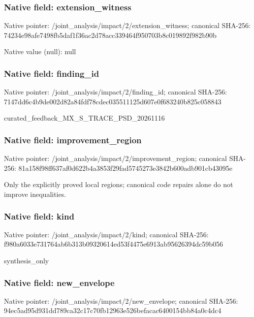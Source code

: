 \documentclass[10pt,a4paper]{article}
\begin{document}
\subsubsection{Native field: extension\_\allowbreak{}witness}
Native pointer: /joint\_\allowbreak{}analysis/impact/2/extension\_\allowbreak{}witness; canonical SHA-256: 74234e98afe7498fb5daf1f36ac2d78acc339464f950703b8c019892f982b90b

Native value (null): null

\subsubsection{Native field: finding\_\allowbreak{}id}
Native pointer: /joint\_\allowbreak{}analysis/impact/2/finding\_\allowbreak{}id; canonical SHA-256: 7147dd6c4b9de002d82a84fdf78cdec035511125d607e0f683240b825c058843

\begingroup\raggedright\sloppy curated\_\allowbreak{}feedback\_\allowbreak{}MX\_\allowbreak{}S\_\allowbreak{}TRACE\_\allowbreak{}PSD\_\allowbreak{}20261116\par\endgroup

\subsubsection{Native field: improvement\_\allowbreak{}region}
Native pointer: /joint\_\allowbreak{}analysis/impact/2/improvement\_\allowbreak{}region; canonical SHA-256: 81a158f98ff637af0d622b4a3853f29fad5745273e3842b600adb901cb43095e

\begingroup\raggedright\sloppy Only the explicitly proved local regions;\allowbreak{} canonical code repairs alone do not improve inequalities.\par\endgroup

\subsubsection{Native field: kind}
Native pointer: /joint\_\allowbreak{}analysis/impact/2/kind; canonical SHA-256: f980a6033e731764ab6b313b09320614ed53f4475e6913ab95626394dc59b056

\begingroup\raggedright\sloppy synthesis\_\allowbreak{}only\par\endgroup

\subsubsection{Native field: new\_\allowbreak{}envelope}
Native pointer: /joint\_\allowbreak{}analysis/impact/2/new\_\allowbreak{}envelope; canonical SHA-256: 94ec5ad95d931dd789ca32c17c70fb12963e526befacac6400154bb84a0c4dc4
\end{document}
